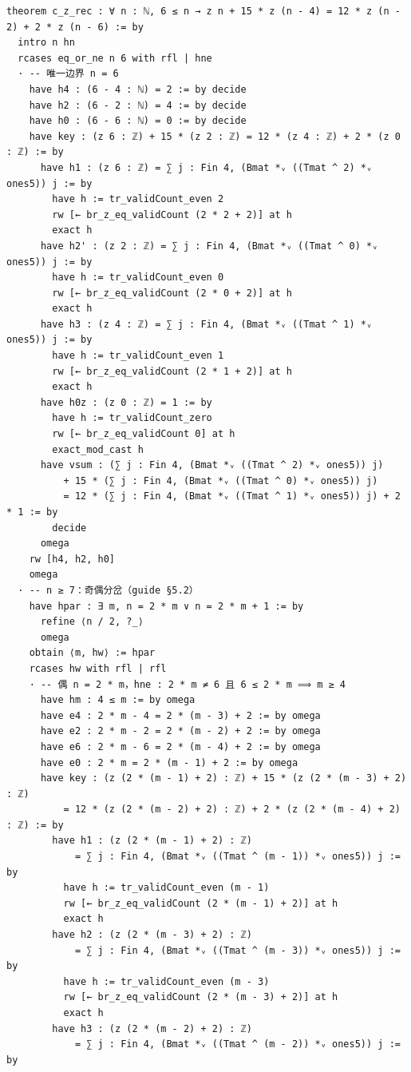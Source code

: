 \documentclass[11pt]{article}
\begin{document}
\begin{lstlisting}
theorem c_z_rec : ∀ n : ℕ, 6 ≤ n → z n + 15 * z (n - 4) = 12 * z (n - 2) + 2 * z (n - 6) := by
  intro n hn
  rcases eq_or_ne n 6 with rfl | hne
  · -- 唯一边界 n = 6
    have h4 : (6 - 4 : ℕ) = 2 := by decide
    have h2 : (6 - 2 : ℕ) = 4 := by decide
    have h0 : (6 - 6 : ℕ) = 0 := by decide
    have key : (z 6 : ℤ) + 15 * (z 2 : ℤ) = 12 * (z 4 : ℤ) + 2 * (z 0 : ℤ) := by
      have h1 : (z 6 : ℤ) = ∑ j : Fin 4, (Bmat *ᵥ ((Tmat ^ 2) *ᵥ ones5)) j := by
        have h := tr_validCount_even 2
        rw [← br_z_eq_validCount (2 * 2 + 2)] at h
        exact h
      have h2' : (z 2 : ℤ) = ∑ j : Fin 4, (Bmat *ᵥ ((Tmat ^ 0) *ᵥ ones5)) j := by
        have h := tr_validCount_even 0
        rw [← br_z_eq_validCount (2 * 0 + 2)] at h
        exact h
      have h3 : (z 4 : ℤ) = ∑ j : Fin 4, (Bmat *ᵥ ((Tmat ^ 1) *ᵥ ones5)) j := by
        have h := tr_validCount_even 1
        rw [← br_z_eq_validCount (2 * 1 + 2)] at h
        exact h
      have h0z : (z 0 : ℤ) = 1 := by
        have h := tr_validCount_zero
        rw [← br_z_eq_validCount 0] at h
        exact_mod_cast h
      have vsum : (∑ j : Fin 4, (Bmat *ᵥ ((Tmat ^ 2) *ᵥ ones5)) j)
          + 15 * (∑ j : Fin 4, (Bmat *ᵥ ((Tmat ^ 0) *ᵥ ones5)) j)
          = 12 * (∑ j : Fin 4, (Bmat *ᵥ ((Tmat ^ 1) *ᵥ ones5)) j) + 2 * 1 := by
        decide
      omega
    rw [h4, h2, h0]
    omega
  · -- n ≥ 7：奇偶分岔（guide §5.2）
    have hpar : ∃ m, n = 2 * m ∨ n = 2 * m + 1 := by
      refine ⟨n / 2, ?_⟩
      omega
    obtain ⟨m, hw⟩ := hpar
    rcases hw with rfl | rfl
    · -- 偶 n = 2 * m，hne : 2 * m ≠ 6 且 6 ≤ 2 * m ⟹ m ≥ 4
      have hm : 4 ≤ m := by omega
      have e4 : 2 * m - 4 = 2 * (m - 3) + 2 := by omega
      have e2 : 2 * m - 2 = 2 * (m - 2) + 2 := by omega
      have e6 : 2 * m - 6 = 2 * (m - 4) + 2 := by omega
      have e0 : 2 * m = 2 * (m - 1) + 2 := by omega
      have key : (z (2 * (m - 1) + 2) : ℤ) + 15 * (z (2 * (m - 3) + 2) : ℤ)
          = 12 * (z (2 * (m - 2) + 2) : ℤ) + 2 * (z (2 * (m - 4) + 2) : ℤ) := by
        have h1 : (z (2 * (m - 1) + 2) : ℤ)
            = ∑ j : Fin 4, (Bmat *ᵥ ((Tmat ^ (m - 1)) *ᵥ ones5)) j := by
          have h := tr_validCount_even (m - 1)
          rw [← br_z_eq_validCount (2 * (m - 1) + 2)] at h
          exact h
        have h2 : (z (2 * (m - 3) + 2) : ℤ)
            = ∑ j : Fin 4, (Bmat *ᵥ ((Tmat ^ (m - 3)) *ᵥ ones5)) j := by
          have h := tr_validCount_even (m - 3)
          rw [← br_z_eq_validCount (2 * (m - 3) + 2)] at h
          exact h
        have h3 : (z (2 * (m - 2) + 2) : ℤ)
            = ∑ j : Fin 4, (Bmat *ᵥ ((Tmat ^ (m - 2)) *ᵥ ones5)) j := by

\end{lstlisting}
\end{document}
